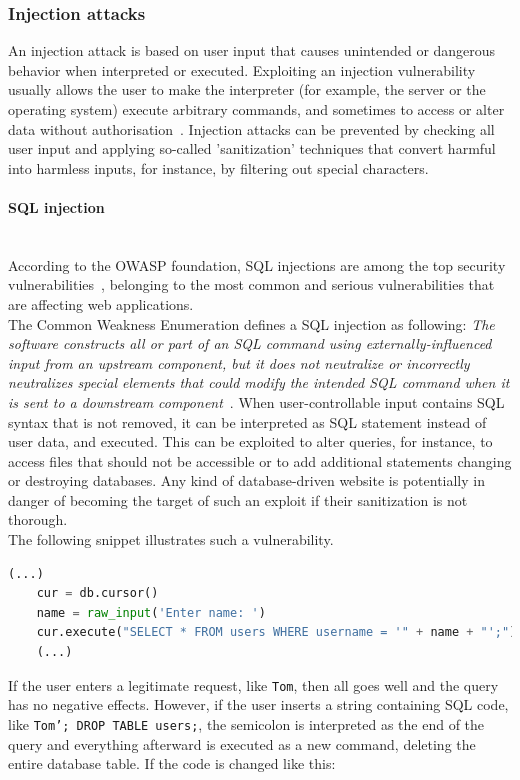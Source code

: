 \documentclass[
a4paper,
pagesize,
pdftex,
12pt,
twoside, %
BCOR=5mm, %
ngerman,
fleqn,
final,
]{scrartcl}
\begin{document}
	\subsubsection{Injection attacks}
	An injection attack is based on user input that causes unintended or dangerous behavior when interpreted or executed. Exploiting an injection vulnerability usually allows the user to make the interpreter (for example, the server or the operating system) execute arbitrary commands, and sometimes to access or alter data without authorisation~\cite{Micheelsen.2016}. Injection attacks can be prevented by checking all user input and applying so-called 'sanitization' techniques that convert harmful into harmless inputs, for instance, by filtering out special characters. 
	\paragraph{SQL injection}\mbox{}\\
	According to the OWASP foundation, SQL injections are among the top security vulnerabilities~\cite{OWASPFoundation.}, belonging to the most common and serious vulnerabilities that are affecting web applications.\\ 
	The Common Weakness Enumeration defines a SQL injection as following: \textit{The software constructs all or part of an SQL command using externally-influenced input from an upstream component, but it does not neutralize or incorrectly neutralizes special elements that could modify the intended SQL command when it is sent to a downstream component}~\cite{CommonWeaknessEnumeration.19.9.2019}. When user-controllable input contains SQL syntax that is not removed, it can be interpreted as SQL statement instead of user data, and executed. This can be exploited to alter queries, for instance, to access files that should not be accessible or to add additional statements changing or destroying databases. Any kind of database-driven website is potentially in danger of becoming the target of such an exploit if their sanitization is not thorough.\\
	The following snippet illustrates such a vulnerability.
	\begin{lstlisting}[language=Python,showstringspaces=false]
	(...)
	cur = db.cursor()
	name = raw_input('Enter name: ')
	cur.execute("SELECT * FROM users WHERE username = '" + name + "';")
	(...)
	\end{lstlisting}
	If the user enters a legitimate request, like \texttt{Tom}, then all goes well and the query has no negative effects. However, if the user inserts a string containing SQL code, like \texttt{Tom'; DROP TABLE users;}, the semicolon is interpreted as the end of the query and everything afterward is executed as a new command, deleting the entire database table. If the code is changed like this:
\end{document}
